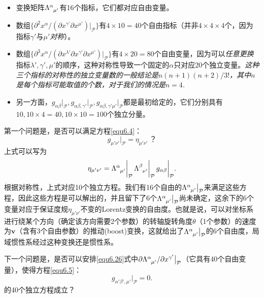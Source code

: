 \begin{itemize}
\item 变换矩阵$\Lambda\indices{^\alpha_{\mu'}}$有16个指标，它们都对应自由变量。
\item 数组$\{ \partial^2 x^\alpha / ( \partial x^{\gamma'} \partial x^{\mu'} ) \big|_{\mathcal{P}} \}$有$4 \times 10 = 40$个自由指标（并非$4 \times 4 \times 4$个，因为指标$\gamma'$与$\mu'$\textit{对称}）。
\item 数组$\{ \partial^3 x^\alpha / ( \partial x^{\lambda'} \partial x^{\gamma'} \partial x^{\mu'} ) \big|_{\mathcal{P}} \}$有$4 \times 20 = 80$个自由变量，因为可以\textit{任意更换}指标$\lambda', \gamma', \mu'$的顺序，这种对称性导致一个固定的$\alpha$只对应20个独立变量。\textit{这种三个指标的对称性的独立变量数的一般结论是$n ( n+1) (n+2) / 3!$，其中$n$是每个指标可能取值的个数，对于我们的情况是$n = 4$.}
\item 另一方面，$g_{\alpha \beta} \big|_{\mathcal{P}}, g_{\alpha \beta, \gamma'} \big|_{\mathcal{P}}, g_{\alpha \beta, \gamma' \mu'} \big|_{\mathcal{P}}$都是最初给定的，它们分别具有$10, 10\times4 = 40, 10 \times 10 = 100$个独立分量。
\end{itemize}
第一个问题是，是否可以满足方程\eqref{equ6.4}：
\begin{equation}
    g_{\mu' \nu'} \bigg|_{\mathcal{P}} = \eta_{\mu' \nu'} \ \text{？}
\label{equ6.27}
\end{equation}
上式可以写为
\begin{equation}
    \eta_{\mu' \nu'} = \Lambda\indices{^\alpha_{\mu'}}\bigg|_{\mathcal{P}} \, \Lambda\indices{^\beta_{\nu'}} \bigg|_{\mathcal{P}} \, g_{\alpha \beta} \bigg|_{\mathcal{P}}.
\label{equ6.28}
\end{equation}
根据对称性，上式对应10个独立方程。我们有16个自由的$\Lambda\indices{^\alpha_{\mu'}}\big|_{\mathcal{P}}$来满足这些方程，因此这些方程是可以解出的，并且留下了6个$\Lambda\indices{^\alpha_{\mu'}}\big|_{\mathcal{P}}$尚未确定，这余下的6个变量对应于保证度规$\eta_{\mu' \nu'}$不变的Lorentz变换的自由度。也就是说，可以对坐标系进行绕某个方向（确定该方向需要2个参数）的转轴旋转角度$\theta$（1个参数）的速度为$\mathbf{v}$（含有3个自由参数）的推动(boost)变换，这就给出了$\Lambda\indices{^\alpha_{\mu'}} \big|_{\mathcal{P}}$的6个自由度，局域惯性系经过这种变换还是惯性系。

下一个问题是，是否可以安排\eqref{equ6.26}式中$\partial \Lambda\indices{^\alpha_{\mu'}} / \partial x^{\gamma'} \big|_{\mathcal{P}}$（它具有40个自由变量），使得方程\eqref{equ6.5}：
\begin{equation}
    g_{\alpha' \beta' , \mu'} \bigg|_{\mathcal{P}} = 0.
\label{equ6.29}
\end{equation} 
的40个独立方程成立？

